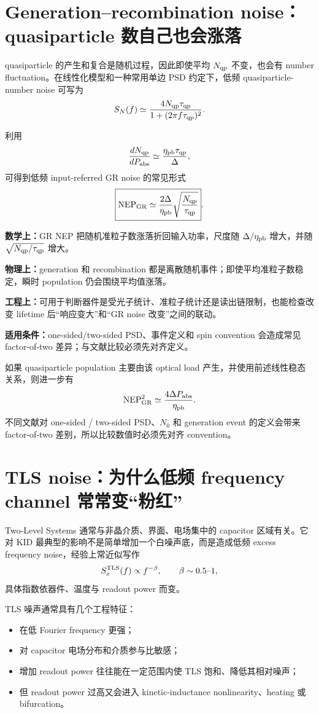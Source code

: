 \documentclass[11pt,a4paper,openany]{ctexrep}
\newcommand{\formulaexplain}[4]{%
\begin{formulaguidebox}
\textbf{\color{KidBlue}数学上：}#1\par
\textbf{\color{KidTeal}物理上：}#2\par
\textbf{\color{KidGold!55!black}工程上：}#3\par
\textbf{\color{KidRed}适用条件：}#4
\end{formulaguidebox}%
}
\begin{document}
\section{Generation--recombination noise：quasiparticle 数自己也会涨落}

quasiparticle 的产生和复合是随机过程，因此即使平均 $N_{\rm qp}$ 不变，也会有 number fluctuation。在线性化模型和一种常用单边 PSD 约定下，低频 quasiparticle-number noise 可写为
\[
S_N(f)
\simeq
\frac{4N_{\rm qp}\tau_{\rm qp}}
{1+(2\pi f\tau_{\rm qp})^2}.
\]

利用
\[
\frac{dN_{\rm qp}}{dP_{\rm abs}}
\simeq
\frac{\eta_{\rm pb}\tau_{\rm qp}}{\Delta},
\]
可得到低频 input-referred GR noise 的常见形式
\[
\boxed{
\mathrm{NEP}_{\rm GR}
\simeq
\frac{2\Delta}{\eta_{\rm pb}}
\sqrt{\frac{N_{\rm qp}}{\tau_{\rm qp}}}
}.
\]
\formulaexplain
{GR NEP 把随机准粒子数涨落折回输入功率，尺度随 $\Delta/\eta_{\rm pb}$ 增大，并随 $\sqrt{N_{\rm qp}/\tau_{\rm qp}}$ 增大。}
{generation 和 recombination 都是离散随机事件；即使平均准粒子数稳定，瞬时 population 仍会围绕平均值涨落。}
{可用于判断器件是受光子统计、准粒子统计还是读出链限制，也能检查改变 lifetime 后“响应变大”和“GR noise 改变”之间的联动。}
{one-sided/two-sided PSD、事件定义和 spin convention 会造成常见 factor-of-two 差异；与文献比较必须先对齐定义。}
如果 quasiparticle population 主要由该 optical load 产生，并使用前述线性稳态关系，则进一步有
\[
\mathrm{NEP}_{\rm GR}^2
\simeq
\frac{4\Delta P_{\rm abs}}{\eta_{\rm pb}}.
\]
不同文献对 one-sided / two-sided PSD、$N_0$ 和 generation event 的定义会带来 factor-of-two 差别，所以比较数值时必须先对齐 convention。

\section{TLS noise：为什么低频 frequency channel 常常变“粉红”}

Two-Level Systems 通常与非晶介质、界面、电场集中的 capacitor 区域有关。它对 KID 最典型的影响不是简单增加一个白噪声底，而是造成低频 excess frequency noise，经验上常近似写作
\[
S_x^{\rm TLS}(f)\propto f^{-\beta},
\qquad \beta\sim 0.5\text{--}1,
\]
具体指数依器件、温度与 readout power 而变。

TLS 噪声通常具有几个工程特征：
\begin{itemize}
  \item 在低 Fourier frequency 更强；
  \item 对 capacitor 电场分布和介质参与比敏感；
  \item 增加 readout power 往往能在一定范围内使 TLS 饱和、降低其相对噪声；
  \item 但 readout power 过高又会进入 kinetic-inductance nonlinearity、heating 或 bifurcation。
\end{itemize}
\end{document}
